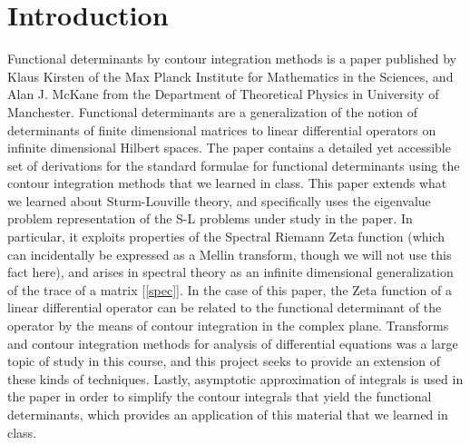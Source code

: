\documentclass[12]{article}
\begin{document}
\section{Introduction}
\setlength{\parindent}{0pt}

Functional determinants by contour integration methods is a paper published by Klaus Kirsten of the Max Planck Institute for Mathematics in the Sciences, and Alan J. McKane from the Department of Theoretical Physics in University of Manchester. Functional determinants are a generalization of the notion of determinants of finite dimensional matrices to linear differential operators on infinite dimensional Hilbert spaces. The paper contains a detailed yet accessible set of derivations for the standard formulae for functional determinants using the contour integration methods that we learned in class. This paper extends what we learned about Sturm-Louville theory, and specifically uses the eigenvalue problem representation of the S-L problems under study in the paper. In particular, it exploits properties of the Spectral Riemann Zeta function (which can incidentally be expressed as a Mellin transform, though we will not use this fact here), and arises in spectral theory as an infinite dimensional generalization of the trace of a matrix [\ref{spec}]. In the case of this paper, the Zeta function of a linear differential operator can be related to the functional determinant of the operator by the means of contour integration in the complex plane. Transforms and contour integration methods for analysis of differential equations was a large topic of study in this course, and this project seeks to provide an extension of these kinds of techniques. Lastly, asymptotic approximation of integrals is used in the paper in order to simplify the contour integrals that yield the functional determinants, which provides an application of this material that we learned in class. \\


\\
\end{document}

